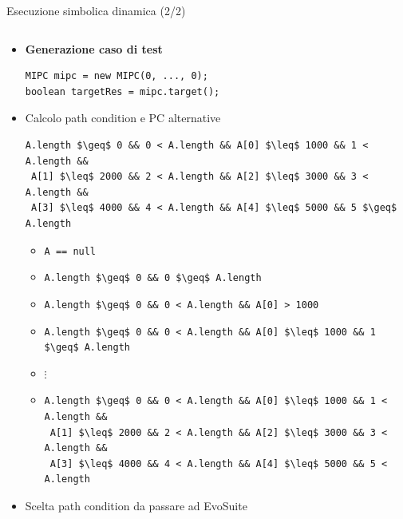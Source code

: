\documentclass{beamer}
\begin{document}
\begin{frame}[fragile]{Esecuzione simbolica dinamica (2/2)}
    \begin{columns}[T]
        \begin{column}{\textwidth}
            \begingroup
            \setlength{\leftmargini}{13.3mm}
            \begin{itemize}
                \item \textbf{Generazione caso di test}
                \begin{lstlisting}
MIPC mipc = new MIPC(0, ..., 0);
boolean targetRes = mipc.target();
                \end{lstlisting}
                \setlength\itemsep{16.5pt}
                \item Calcolo path condition e PC alternative
                \begin{lstlisting}[breaklines=false]
A.length $\geq$ 0 && 0 < A.length && A[0] $\leq$ 1000 && 1 < A.length && 
 A[1] $\leq$ 2000 && 2 < A.length && A[2] $\leq$ 3000 && 3 < A.length && 
 A[3] $\leq$ 4000 && 4 < A.length && A[4] $\leq$ 5000 && 5 $\geq$ A.length
\end{lstlisting}
                \vspace{-0.8\baselineskip}
                \begin{itemize}
                \setlength\itemsep{-3pt}
    \item \lstinline|A == null|
    \item \lstinline|A.length $\geq$ 0 && 0 $\geq$ A.length|
    \item \lstinline|A.length $\geq$ 0 && 0 < A.length && A[0] > 1000|
    \item \lstinline|A.length $\geq$ 0 && 0 < A.length && A[0] $\leq$ 1000 && 1 $\geq$ A.length|
    \setlength{\itemsep}{-1.5pt}
    \item[] $\vdots$
    \item \begin{lstlisting}[breaklines=false]
A.length $\geq$ 0 && 0 < A.length && A[0] $\leq$ 1000 && 1 < A.length && 
 A[1] $\leq$ 2000 && 2 < A.length && A[2] $\leq$ 3000 && 3 < A.length && 
 A[3] $\leq$ 4000 && 4 < A.length && A[4] $\leq$ 5000 && 5 < A.length 
    \end{lstlisting}
                \end{itemize}
                \setlength\itemsep{0pt}
                \item Scelta path condition da passare ad EvoSuite
                \begin{itemize}

\end{itemize}
\end{itemize}
\end{column}
\end{columns}
\end{frame}
\end{document}
